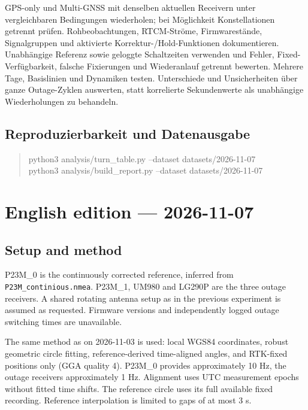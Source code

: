 \documentclass[11pt,a4paper]{article}
\numberwithin{equation}{section}
\numberwithin{figure}{section}
\begin{document}
GPS-only und Multi-GNSS mit denselben aktuellen Receivern unter vergleichbaren Bedingungen wiederholen; bei Möglichkeit Konstellationen getrennt prüfen. Rohbeobachtungen, RTCM-Ströme, Firmwarestände, Signalgruppen und aktivierte Korrektur-/\allowbreak{}Hold-Funktionen dokumentieren. Unabhängige Referenz sowie geloggte Schaltzeiten verwenden und Fehler, Fixed-Verfügbarkeit, falsche Fixierungen und Wiederanlauf getrennt bewerten. Mehrere Tage, Basislinien und Dynamiken testen. Unterschiede und Unsicherheiten über ganze Outage-Zyklen auswerten, statt korrelierte Sekundenwerte als unabhängige Wiederholungen zu behandeln.

\subsection{Reproduzierbarkeit und Datenausgabe}

\begin{quote}\ttfamily\footnotesize python3 analysis/\allowbreak{}turn\_table.py --dataset datasets/\allowbreak{}2026-11-07\\python3 analysis/\allowbreak{}build\_report.py --dataset datasets/\allowbreak{}2026-11-07\end{quote}

\clearpage\section{English edition — 2026-11-07}

\subsection{Setup and method}

P23M\_0 is the continuously corrected reference, inferred from {\small\texttt{P23M\_\allowbreak{}continious.nmea}}. P23M\_1, UM980 and LG290P are the three outage receivers. A shared rotating antenna setup as in the previous experiment is assumed as requested. Firmware versions and independently logged outage switching times are unavailable.

The same method as on 2026-11-03 is used: local WGS84 coordinates, robust geometric circle fitting, reference-derived time-aligned angles, and RTK-fixed positions only (GGA quality 4). P23M\_0 provides approximately 10 Hz, the outage receivers approximately 1 Hz. Alignment uses UTC measurement epochs without fitted time shifts. The reference circle uses its full available fixed recording. Reference interpolation is limited to gaps of at most 3 s.
\end{document}
